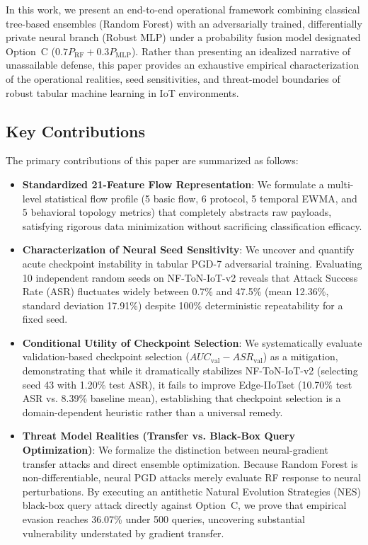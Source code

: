\documentclass[10pt,journal,compsoc,twocolumn]{IEEEtran}
\begin{document}
In this work, we present an end-to-end operational framework combining classical tree-based ensembles (Random Forest) with an adversarially trained, differentially private neural branch (Robust MLP) under a probability fusion model designated Option~C ($0.7 P_{\text{RF}} + 0.3 P_{\text{MLP}}$). Rather than presenting an idealized narrative of unassailable defense, this paper provides an exhaustive empirical characterization of the operational realities, seed sensitivities, and threat-model boundaries of robust tabular machine learning in IoT environments.

\subsection{Key Contributions}
The primary contributions of this paper are summarized as follows:
\begin{itemize}
    \item \textbf{Standardized 21-Feature Flow Representation}: We formulate a multi-level statistical flow profile (5 basic flow, 6 protocol, 5 temporal EWMA, and 5 behavioral topology metrics) that completely abstracts raw payloads, satisfying rigorous data minimization without sacrificing classification efficacy.
    \item \textbf{Characterization of Neural Seed Sensitivity}: We uncover and quantify acute checkpoint instability in tabular PGD-7 adversarial training. Evaluating 10 independent random seeds on NF-ToN-IoT-v2 reveals that Attack Success Rate (ASR) fluctuates widely between 0.7\% and 47.5\% (mean 12.36\%, standard deviation 17.91\%) despite 100\% deterministic repeatability for a fixed seed.
    \item \textbf{Conditional Utility of Checkpoint Selection}: We systematically evaluate validation-based checkpoint selection ($AUC_{\text{val}} - ASR_{\text{val}}$) as a mitigation, demonstrating that while it dramatically stabilizes NF-ToN-IoT-v2 (selecting seed 43 with 1.20\% test ASR), it fails to improve Edge-IIoTset (10.70\% test ASR vs. 8.39\% baseline mean), establishing that checkpoint selection is a domain-dependent heuristic rather than a universal remedy.
    \item \textbf{Threat Model Realities (Transfer vs. Black-Box Query Optimization)}: We formalize the distinction between neural-gradient transfer attacks and direct ensemble optimization. Because Random Forest is non-differentiable, neural PGD attacks merely evaluate RF response to neural perturbations. By executing an antithetic Natural Evolution Strategies (NES) black-box query attack directly against Option~C, we prove that empirical evasion reaches 36.07\% under 500 queries, uncovering substantial vulnerability understated by gradient transfer.

\end{itemize}
\end{document}
